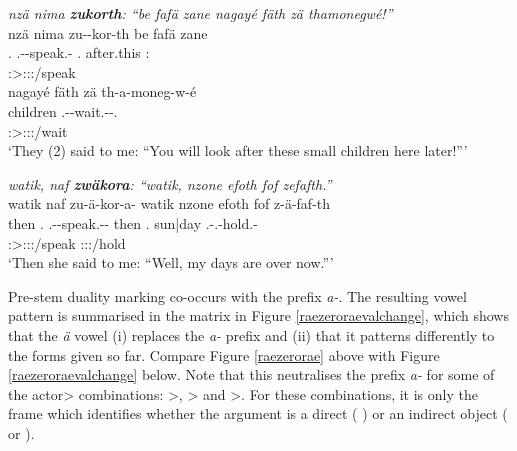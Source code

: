\begin{exe}
	\ex \emph{nzä nima \textbf{zukorth}: ``be fafä zane nagayé fäth zä thamonegwé!''}\\
	\glll nzä nima zu-\Zero-kor-th be fafä zane\\
	\Fsg.\Abs{} \Quot{} \Fsg.\Gam-\Du-speak.\Rs-\Stnsg{} \Ssg.\Erg{} after.this \Dem:\Prox{}\\
	{} {} \footnotesize{\Stdu:\Sbj>\Fsg:\Obj:\Rpst:\Pfv/speak} {} {} {}\\
	\sn
	\glll nagayé fäth zä th-a-moneg-w-é\\
	children \Dim{} \Prox{} \Stnsg.\Bet-\Vc-wait.\Ext-\Ndu-\Ssg.\Imp{}\\
	{} {} {} \footnotesize{\Ssg:\Sbj>\Stpl:\Io:\Imp:\Ipfv/wait}\\
	\trans `They (2) said to me: ``You will look after these small children here later!'''\\ 
	\label{ex258}
\end{exe}
\begin{exe}
	\ex \emph{watik, naf \textbf{zwäkora}: ``watik, nzone efoth fof \hspace*{2cm} zefafth.''}\\
	\glll watik naf zu-ä-kor-a-\Zero{} watik nzone efoth fof\hspace*{2cm} z-ä-faf-th\\
	then \Tsg.\Erg{} \Fsg.\Gam-\Ndu-speak.\Rs-\Pst-\Stsg{} then \Fsg.\Poss{} sun|day \Emph{} \M.\Gam-\Ndu.\Vc-hold.\Rs-\Stnsg{}\\
	{} {} \footnotesize{\Stsg:\Sbj>\Fsg:\Obj:\Pst:\Pfv/speak} {} {} {} {} \footnotesize{\Stnsg:\Sbj:\Pst:\Pfv/hold}\\
	\trans `Then she said to me: ``Well, my days are over now.''' 
	\label{ex257}
\end{exe}

Pre-stem duality marking co-occurs with the  prefix \emph{a-}. The resulting vowel pattern is summarised in the matrix in Figure \ref{raezeroraevalchange}, which shows that the  \emph{ä} vowel (i) replaces the \emph{a-} prefix and (ii) that it patterns differently to the forms given so far. Compare Figure \ref{raezerorae} above with Figure \ref{raezeroraevalchange} below. Note that this neutralises the  prefix \emph{a-} for some of the actor> combinations: \Pl>\Sg{}, \Sg>\Pl{} and \Pl>\Pl{}. For these combinations, it is only the  frame which identifies whether the  argument is a direct  (\Abs{} ) or an indirect object (\Dat{} or \Poss{} ).


